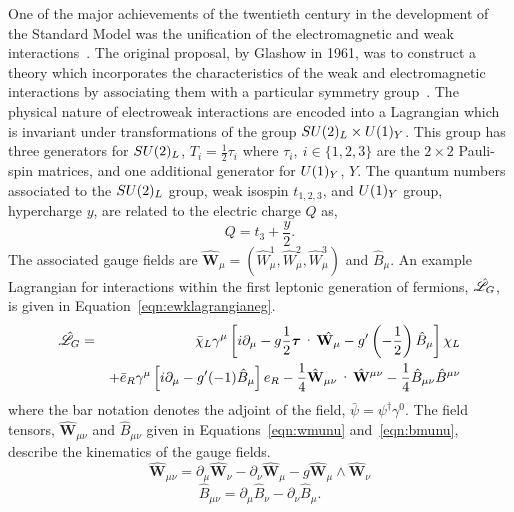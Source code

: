 One of the major achievements of the twentieth century in 
the development of the Standard Model was the unification of the electromagnetic 
and weak interactions~\citep{glashow,weignberg,salam}. 
The original proposal, by Glashow in 1961, was
to construct a theory which incorporates the characteristics of 
the weak and electromagnetic interactions by associating them 
with a particular symmetry group~\citep{glashow}.
The physical nature of electroweak interactions are encoded into a Lagrangian which 
is invariant under transformations of the group $SU(2)_{L}\times U(1)_{Y}$. 
This group has three generators for $SU(2)_{L}$, $T_{i} = \frac{1}{2}\tau_{i}$ 
where $\tau_{i},~i\in \{1,2,3 \}$ are the $2\times2$ Pauli-spin matrices, and one
additional generator for $U(1)_{Y}$, $Y$.
The quantum numbers associated to the $SU(2)_{L}$ group, weak isospin $t_{1,2,3}$, and 
$U(1)_{Y}$ group, hypercharge $y$, are related to the electric charge $Q$ as,
\begin{equation}
Q = t_{3}+\frac{y}{2}.
\end{equation} 
The associated gauge fields are 
$\hat{\mathbf{W}}_{\mu} = \left(\hat{W}_{\mu}^{1},\hat{W}_{\mu}^{2},\hat{W}_{\mu}^{3}\right)$
 and $\hat{B}_{\mu}$.
An example Lagrangian for interactions within the first leptonic generation of fermions, $\hat{\mathscr{L}}_{G}$, is 
given in Equation~\ref{eqn:ewklagrangianeg}.
\begin{eqnarray}
\lagr_{G} & =& \bar{\chi}_{L}\gamma^{\mu}\left[i\partial_{\mu} 
		   - g\frac{1}{2}\boldsymbol{\tau}\cdot\hat{\mathbf{W}_{\mu}}
		   - g^{\prime}\left(-\frac{1}{2}\right)\hat{B}_{\mu}\right] \chi_{L}
\nonumber \\
& &		   + \bar{e}_{R}\gamma^{\mu}\left[i\partial_{\mu} 
		   - g^{\prime}(-1)\hat{B}_{\mu}\right]{e}_{R}
		     -\frac{1}{4}
		     \hat{\mathbf{W}}_{\mu\nu}\cdot\hat{\mathbf{W}}^{\mu\nu} 
		     -\frac{1}{4}
		     \hat{B}_{\mu\nu}\hat{B}^{\mu\nu}
\label{eqn:ewklagrangianeg}
\end{eqnarray}
where the bar notation denotes the adjoint of the field, $\bar{\psi}=\psi^{\dagger}\gamma^{0}$.
The field tensors, $\hat{\mathbf{W}}_{\mu\nu}$ and $\hat{B}_{\mu\nu}$ given in 
Equations~\ref{eqn:wmunu} and~\ref{eqn:bmunu},
describe the kinematics of the gauge fields.
\begin{equation}
\hat{\mathbf{W}}_{\mu\nu} = \partial_{\mu}\hat{\mathbf{W}}_{\nu} - \partial_{\nu}\hat{\mathbf{W}}_{\mu} - g \hat{\mathbf{W}}_{\mu}\wedge\hat{\mathbf{W}}_{\nu}
\label{eqn:wmunu}
\end{equation}
\begin{equation}
\hat{B}_{\mu\nu} = \partial_{\mu}\hat{B}_{\nu} - \partial_{\nu}\hat{B}_{\mu}.
\label{eqn:bmunu}
\end{equation}

